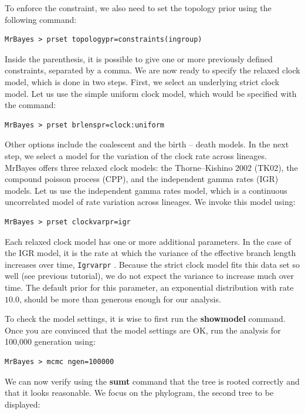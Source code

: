 \documentclass[12pt]{book}
\newcommand{\ttt}[1]{\texttt{#1} }
\begin{document}
To enforce the constraint, we also need to set the topology prior using the following command:

\begin{verbatim}
MrBayes > prset topologypr=constraints(ingroup)
\end{verbatim}

Inside the parenthesis, it is possible to give one or more previously defined constraints,
separated by a comma.  We are now ready to specify the relaxed clock model, which is done in two
steps. First, we select an underlying strict clock model. Let us use the simple uniform clock
model, which would be specified with the command:

\begin{verbatim}
MrBayes > prset brlenspr=clock:uniform
\end{verbatim}

Other options include the coalescent and the birth -- death models. In the next step, we select a
model for the variation of the clock rate across lineages. MrBayes offers three relaxed clock
models: the Thorne--Kishino 2002 (TK02), the compound poisson process (CPP), and the independent
gamma rates (IGR) models. Let us use the independent gamma rates model, which is a continuous
uncorrelated model of rate variation across lineages.  We invoke this model using:

\begin{verbatim}
MrBayes > prset clockvarpr=igr
\end{verbatim}

Each relaxed clock model has one or more additional parameters. In the case of the IGR model, it is
the rate at which the variance of the effective branch length increases over time, \ttt{Igrvarpr}.
Because the strict clock model fits this data set so well (see previous tutorial), we do not expect
the variance to increase much over time.  The default prior for this parameter, an exponential
distribution with rate $10.0$, should be more than generous enough for our analysis.

To check the model settings, it is wise to first run the \textbf{showmodel} command. Once you are
convinced that the model settings are OK, run the analysis for 100,000 generation using:

\begin{verbatim}
MrBayes > mcmc ngen=100000
\end{verbatim}

We can now verify using the \textbf{sumt} command that the tree is rooted correctly and that it
looks reasonable.  We focus on the phylogram, the second tree to be displayed:
\end{document}
